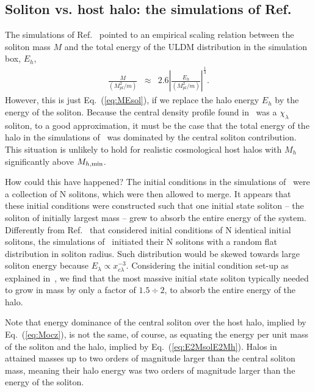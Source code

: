 \documentclass[aps,prd,floats,superscriptaddress,showpacs,nofootinbib,twocolumn,preprintnumbers]{revtex4-1}%
\def\be{\begin{eqnarray}}
\def\ee{\end{eqnarray}}
\begin{document}
\subsection{Soliton vs. host halo: the simulations of Ref.~\cite{Mocz:2017wlg}}\label{ss:Mocz}
%
The simulations of Ref.~\cite{Mocz:2017wlg} pointed to an empirical scaling relation between the soliton mass $M$ and the total energy of the ULDM distribution in the simulation box, $E_h$, 
%
\be \label{eq:Mocz}
\frac{M}{(M_{pl}^2/m)}&\approx&2.6\left|\frac{E_h}{(M_{pl}^2/m)}\right|^{\frac{1}{3}}.
%
\ee
%
However, this is just Eq.~(\ref{eq:MEsol}), if we replace the halo
energy $E_h$ by the energy of the  soliton. Because the central
density profile found in~\cite{Mocz:2017wlg} was a $\chi_\lambda$
soliton, to a good approximation, it must be the case that the total
energy of the halo in the simulations of~\cite{Mocz:2017wlg} was
dominated by the central soliton contribution. This situation is
unlikely to hold for realistic cosmological host halos with $M_h$ significantly above $M_{h,\rm min}$. 

How could this have happened? The initial conditions in the
simulations of~\cite{Mocz:2017wlg} were a collection of N solitons,
which were then allowed to merge. It appears that these initial
conditions were constructed such that one initial state soliton -- the
soliton of initially largest mass -- grew to absorb the
entire energy of the system. Differently from 
Ref.~\cite{Schive:2014hza} that considered initial conditions of
N identical initial solitons, the simulations
of~\cite{Mocz:2017wlg} initiated their N solitons with a random flat
distribution in soliton radius. Such distribution would be skewed
towards large soliton energy because $E_\lambda\propto
x_{c\lambda}^{-3}$. Considering the initial condition set-up as
explained in~\cite{Mocz:2017wlg}, we find that the most massive
initial state soliton typically needed to grow in mass by only a
factor of $1.5\div 2$, to absorb the entire energy of the halo.  

Note that energy dominance of the central soliton over the host halo,
implied by Eq.~(\ref{eq:Mocz}), is not the same, of course, as
equating the energy per unit mass of the soliton and the halo, implied
by Eq.~(\ref{eq:E2MsolE2Mh}). Halos
in~\cite{Schive:2014hza,Schive:2014dra} attained masses up to two
orders of magnitude larger than the central soliton mass, meaning
their halo energy was two orders of magnitude larger than the energy
of the soliton.  
\end{document}
